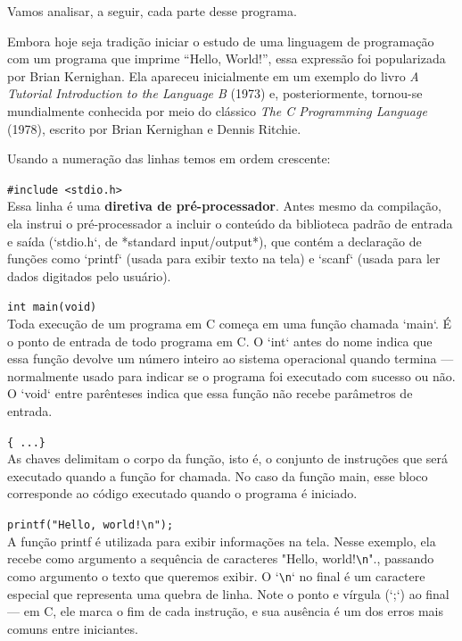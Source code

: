 \documentclass[12pt,a4paper,oneside]{extreport}
\begin{document}
Vamos analisar, a seguir, cada parte desse programa.

\begin{tcolorbox}[title=Curiosidade]

Embora hoje seja tradição iniciar o estudo de uma linguagem de programação
com um programa que imprime ``Hello, World!'', essa expressão foi
popularizada por Brian Kernighan. Ela apareceu inicialmente em um exemplo do
livro \textit{A Tutorial Introduction to the Language B} (1973) e,
posteriormente, tornou-se mundialmente conhecida por meio do clássico
\textit{The C Programming Language} (1978), escrito por Brian Kernighan e
Dennis Ritchie.

\end{tcolorbox}

Usando a numeração das linhas temos em ordem crescente:

\texttt{\#include <stdio.h>} \\
Essa linha é uma \textbf{diretiva de pré-processador}. Antes mesmo da compilação, ela instrui o pré-processador a incluir o conteúdo da biblioteca padrão de entrada e saída (`stdio.h`, de *standard input/output*), que contém a declaração de funções como `printf` (usada para exibir texto na tela) e `scanf` (usada para ler dados digitados pelo usuário).

\texttt{int main(void)} \\
Toda execução de um programa em C começa em uma função chamada `main`. É o ponto de entrada de todo programa em C. O `int` antes do nome indica que essa função devolve um número inteiro ao sistema operacional quando termina — normalmente usado para indicar se o programa foi executado com sucesso ou não. O `void` entre parênteses indica que essa função não recebe parâmetros de entrada.

\texttt{\{ ...\}} \\
As chaves delimitam o corpo da função, isto é, o conjunto de instruções que será executado quando a função for chamada. No caso da função main, esse bloco corresponde ao código executado quando o programa é iniciado.

\texttt{printf("Hello, world!\textbackslash n");} \\
A função printf é utilizada para exibir informações na tela. Nesse exemplo, ela recebe como argumento a sequência de caracteres "Hello, world!\verb|\n|"., passando como argumento o texto que queremos exibir. O `\verb|\n|` no final é um caractere especial que representa uma quebra de linha. Note o ponto e vírgula (`;`) ao final — em C, ele marca o fim de cada instrução, e sua ausência é um dos erros mais comuns entre iniciantes.
\end{document}
